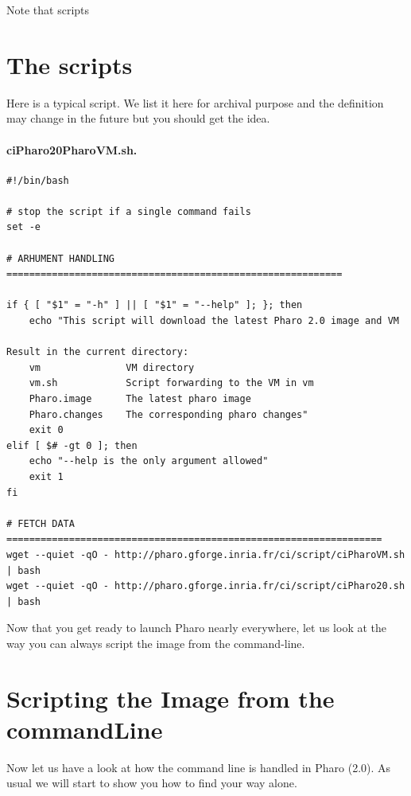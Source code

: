 \documentclass[a4paper,10pt,twoside]{book}
\begin{document}
Note that scripts 

\section{The scripts}
Here is a typical script. We list it here for archival purpose and the definition may change in the future
but you should get the idea.
	
\paragraph{ciPharo20PharoVM.sh.}

\begin{scriptsize}
\begin{verbatim}
#!/bin/bash

# stop the script if a single command fails
set -e 

# ARHUMENT HANDLING ===========================================================

if { [ "$1" = "-h" ] || [ "$1" = "--help" ]; }; then
    echo "This script will download the latest Pharo 2.0 image and VM

Result in the current directory:
    vm               VM directory
    vm.sh            Script forwarding to the VM in vm
    Pharo.image      The latest pharo image
    Pharo.changes    The corresponding pharo changes"
    exit 0
elif [ $# -gt 0 ]; then
    echo "--help is the only argument allowed"
    exit 1
fi

# FETCH DATA ==================================================================
wget --quiet -qO - http://pharo.gforge.inria.fr/ci/script/ciPharoVM.sh | bash
wget --quiet -qO - http://pharo.gforge.inria.fr/ci/script/ciPharo20.sh | bash
\end{verbatim}
\end{scriptsize}

Now that you get ready to launch Pharo nearly everywhere, let us look at the way you 
can always script the image from the command-line. 


\section{Scripting the Image from the commandLine}

Now let us have a look at how the command line is handled in Pharo (2.0). As usual we will start to show you how 
to find your way alone.

\end{document}
